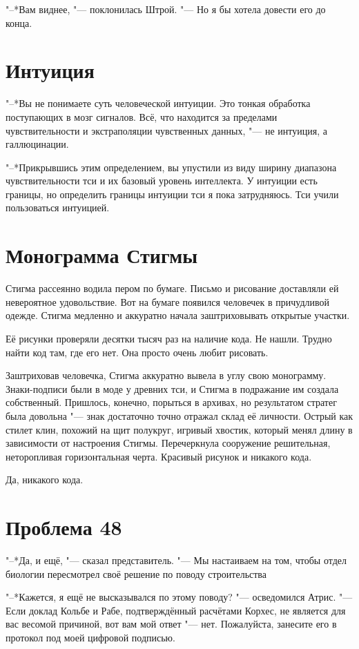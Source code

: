 "--*Вам виднее, "--- поклонилась Штрой.
"--- Но я бы хотела довести его до конца.

\section{Интуиция}

"--*Вы не понимаете суть человеческой интуиции.
Это тонкая обработка поступающих в мозг сигналов.
Всё, что находится за пределами чувствительности и экстраполяции чувственных данных, "--- не интуиция, а галлюцинации.

"--*Прикрывшись этим определением, вы упустили из виду ширину диапазона чувствительности тси и их базовый уровень интеллекта.
У интуиции есть границы, но определить границы интуиции тси я пока затрудняюсь.
Тси учили пользоваться интуицией.

\section{Монограмма Стигмы}

Стигма рассеянно водила пером по бумаге.
Письмо и рисование доставляли ей невероятное удовольствие.
Вот на бумаге появился человечек в причудливой одежде.
Стигма медленно и аккуратно начала заштриховывать открытые участки.

Её рисунки проверяли десятки тысяч раз на наличие кода.
Не нашли.
Трудно найти код там, где его нет.
Она просто очень любит рисовать.

Заштриховав человечка, Стигма аккуратно вывела в углу свою монограмму.
Знаки-подписи были в моде у древних тси, и Стигма в подражание им создала собственный.
Пришлось, конечно, порыться в архивах, но результатом стратег была довольна "--- знак достаточно точно отражал склад её личности.
Острый как стилет клин, похожий на щит полукруг, игривый хвостик, который менял длину в зависимости от настроения Стигмы.
Перечеркнула сооружение решительная, неторопливая горизонтальная черта.
Красивый рисунок и никакого кода.

Да, никакого кода.

\section{Проблема 48}

"--*Да, и ещё, "--- сказал представитель.
"--- Мы настаиваем на том, чтобы отдел биологии пересмотрел своё решение по поводу строительства\ldotst

"--*Кажется, я ещё не высказывался по этому поводу? "--- осведомился Атрис.
"--- Если доклад Кольбе и Рабе, подтверждённый расчётами Корхес, не является для вас весомой причиной, вот вам мой ответ "--- нет.
Пожалуйста, занесите его в протокол под моей цифровой подписью.

